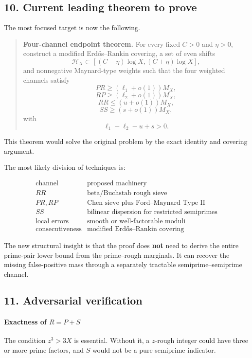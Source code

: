 \subsection*{10. Current leading theorem to prove}

The most focused target is now the following.

\begin{quote}
\textbf{Four-channel endpoint theorem.}
For every fixed \(C>0\) and \(\eta>0\), construct a modified Erdős--Rankin covering, a set of even shifts
\[
\mathcal H_X\subset[(C-\eta)\log X,(C+\eta)\log X],
\]
and nonnegative Maynard-type weights such that the four weighted channels satisfy
\[
PR\ge(\ell_1+o(1))M_X,
\]
\[
RP\ge(\ell_2+o(1))M_X,
\]
\[
RR\le(u+o(1))M_X,
\]
\[
SS\ge(s+o(1))M_X,
\]
with
\[
\ell_1+\ell_2-u+s>0.
\]
\end{quote}

This theorem would solve the original problem by the exact identity and covering argument.

The most likely division of techniques is:

\[
\begin{array}{c|c}
\text{channel}&\text{proposed machinery}\\ \hline
RR&\text{beta/Buchstab rough sieve}\\
PR,RP&\text{Chen sieve plus Ford--Maynard Type II}\\
SS&\text{bilinear dispersion for restricted semiprimes}\\
\text{local errors}&\text{smooth or well-factorable moduli}\\
\text{consecutiveness}&\text{modified Erdős--Rankin covering}
\end{array}
\]

The new structural insight is that the proof does \textbf{not} need to derive the entire prime-pair lower bound from the prime--rough marginals. It can recover the missing false-positive mass through a separately tractable semiprime--semiprime channel.

\subsection*{11. Adversarial verification}

\paragraph{Exactness of \(R=P+S\)}

The condition \(z^3>3X\) is essential. Without it, a \(z\)-rough integer could have three or more prime factors, and \(S\) would not be a pure semiprime indicator.

